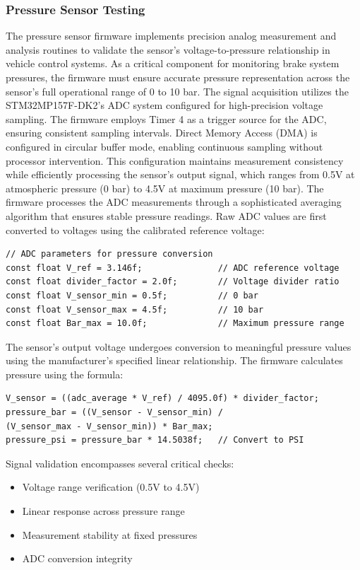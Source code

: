 \documentclass[12pt]{article}
\begin{document}
\subsubsection{Pressure Sensor Testing}
The pressure sensor firmware implements precision analog measurement and analysis routines to validate the sensor's voltage-to-pressure relationship in vehicle control systems. As a critical component for monitoring brake system pressures, the firmware must ensure accurate pressure representation across the sensor's full operational range of 0 to 10 bar.
The signal acquisition utilizes the STM32MP157F-DK2's ADC system configured for high-precision voltage sampling. The firmware employs Timer 4 as a trigger source for the ADC, ensuring consistent sampling intervals. Direct Memory Access (DMA) is configured in circular buffer mode, enabling continuous sampling without processor intervention. This configuration maintains measurement consistency while efficiently processing the sensor's output signal, which ranges from 0.5V at atmospheric pressure (0 bar) to 4.5V at maximum pressure (10 bar).
The firmware processes the ADC measurements through a sophisticated averaging algorithm that ensures stable pressure readings. Raw ADC values are first converted to voltages using the calibrated reference voltage:
\begin{verbatim}
// ADC parameters for pressure conversion
const float V_ref = 3.146f;               // ADC reference voltage
const float divider_factor = 2.0f;        // Voltage divider ratio
const float V_sensor_min = 0.5f;          // 0 bar
const float V_sensor_max = 4.5f;          // 10 bar
const float Bar_max = 10.0f;              // Maximum pressure range
\end{verbatim}
The sensor's output voltage undergoes conversion to meaningful pressure values using the manufacturer's specified linear relationship. The firmware calculates pressure using the formula:
\begin{verbatim}
V_sensor = ((adc_average * V_ref) / 4095.0f) * divider_factor;
pressure_bar = ((V_sensor - V_sensor_min) /
(V_sensor_max - V_sensor_min)) * Bar_max;
pressure_psi = pressure_bar * 14.5038f;   // Convert to PSI
\end{verbatim}
Signal validation encompasses several critical checks:
\begin{itemize}
\item Voltage range verification (0.5V to 4.5V)
\item Linear response across pressure range
\item Measurement stability at fixed pressures
\item ADC conversion integrity
\end{itemize}
\end{document}
